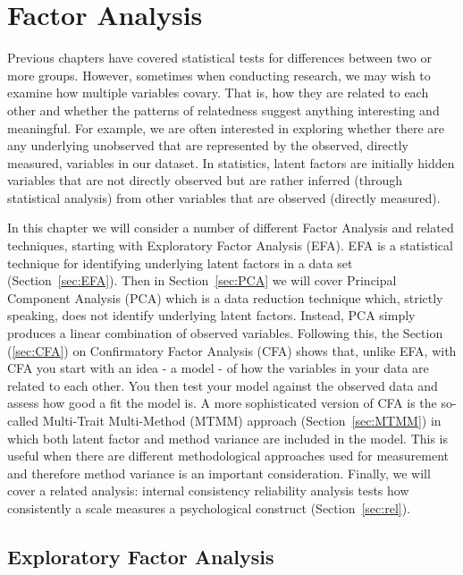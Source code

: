
\chapter{Factor Analysis \label{ch:factoranalysis}}

Previous chapters have covered statistical tests for differences between two or more groups. However, sometimes when conducting research, we may wish to examine how multiple variables covary. That is, how they are related to each other and whether the patterns of relatedness suggest anything interesting and meaningful. For example, we are often interested in exploring whether there are any underlying unobserved  that are represented by the observed, directly measured, variables in our dataset. In statistics, latent factors are initially hidden variables that are not directly observed but are rather inferred (through statistical analysis) from other variables that are observed (directly measured).

In this chapter we will consider a number of different Factor Analysis and related techniques, starting with Exploratory Factor Analysis (EFA). EFA is a statistical technique for identifying underlying latent factors in a data set (Section~\ref{sec:EFA}). Then in Section~\ref{sec:PCA} we will cover Principal Component Analysis (PCA) which is a data reduction technique which, strictly speaking, does not identify underlying latent factors. Instead, PCA simply produces a linear combination of observed variables. Following this, the Section (\ref{sec:CFA}) on Confirmatory Factor Analysis (CFA) shows that, unlike EFA, with CFA you start with an idea - a model - of how the variables in your data are related to each other. You then test your model against the observed data and assess how good a fit the model is. A more sophisticated version of CFA is the so-called Multi-Trait Multi-Method (MTMM) approach (Section~\ref{sec:MTMM}) in which both latent factor and method variance are included in the model. This is useful when there are different methodological approaches used for measurement and therefore method variance is an important consideration. Finally, we will cover a related analysis: internal consistency reliability analysis tests how consistently a scale measures a psychological construct (Section~\ref{sec:rel}).


\section{Exploratory Factor Analysis~\label{sec:EFA}}

